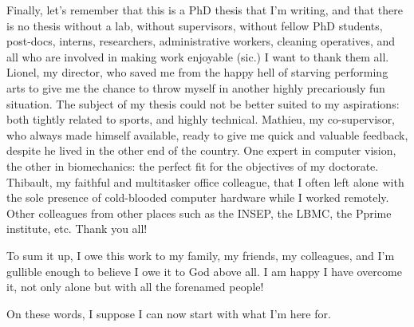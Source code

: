 Finally, let's remember that this is a PhD thesis that I'm writing, and that there is no thesis without a lab, without supervisors, without fellow PhD students, post-docs, interns, researchers, administrative workers, cleaning operatives, and all who are involved in making work enjoyable (sic.) I want to thank them all. Lionel, my director, who saved me from the happy hell of starving performing arts to give me the chance to throw myself in another highly precariously fun situation. The subject of my thesis could not be better suited to my aspirations: both tightly related to sports, and highly technical. Mathieu, my co-supervisor, who always made himself available, ready to give me quick and valuable feedback, despite he lived in the other end of the country. One expert in computer vision, the other in biomechanics: the perfect fit for the objectives of my doctorate. Thibault, my faithful and multitasker office colleague, that I often left alone with the sole presence of cold-blooded computer hardware while I worked remotely. Other colleagues from other places such as the INSEP, the LBMC, the Pprime institute, etc. Thank you all!

To sum it up, I owe this work to my family, my friends, my colleagues, and I'm gullible enough to believe I owe it to God above all. I am happy I have overcome it, not only alone but with all the forenamed people!

On these words, I suppose I can now start with what I'm here for.